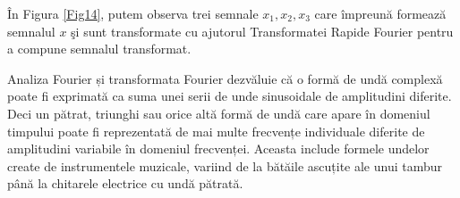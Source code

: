	\^{I}n Figura \ref{Fig14}, putem observa trei semnale $x_1, x_2, x_3$ care \^{i}mpreun\u{a} formeaz\u{a} semnalul $x$ \c{s}i sunt transformate cu ajutorul Transformatei Rapide Fourier pentru a compune semnalul transformat. 
	
	Analiza Fourier și transformata Fourier dezvăluie că o formă de undă complexă poate fi exprimată ca suma unei serii de unde sinusoidale de amplitudini diferite. Deci un pătrat, triunghi sau orice altă formă de undă care apare în domeniul timpului poate fi reprezentată de mai multe frecvențe individuale diferite de amplitudini variabile în domeniul frecvenței. Aceasta include formele undelor create de instrumentele muzicale, variind de la bătăile ascuțite ale unui tambur până la chitarele electrice cu undă pătrată.
	
